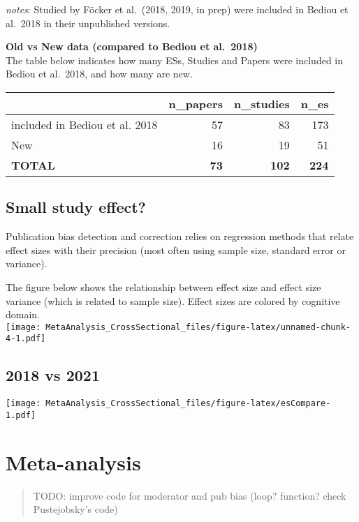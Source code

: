 \documentclass[
]{book}
\begin{document}
\emph{notes}: Studied by Föcker et al.~(2018, 2019, in prep) were included in Bediou et al.~2018
in their unpublished versions.

\textbf{Old vs New data (compared to Bediou et al.~2018) }\\
The table below indicates how many ESs, Studies and Papers were included in
Bediou et al.~2018, and how many are new.

\begin{table}
\centering
\begin{tabular}{l|r|r|r}
\hline
  & n\_papers & n\_studies & n\_es\\
\hline
included in Bediou et al. 2018 & 57 & 83 & 173\\
\hline
New & 16 & 19 & 51\\
\hline
\textbf{TOTAL} & \textbf{73} & \textbf{102} & \textbf{224}\\
\hline
\end{tabular}
\end{table}

\hypertarget{small-study-effect}{%
\section{Small study effect?}\label{small-study-effect}}

Publication bias detection and correction relies on regression methods that relate
effect sizes with their precision (most often using sample size, standard error or variance).

The figure below shows the relationship between effect size and effect size variance
(which is related to sample size). Effect sizes are colored by cognitive domain.\\
\texttt{[image: MetaAnalysis\_CrossSectional\_files/figure-latex/unnamed-chunk-4-1.pdf]}

\hypertarget{vs-2021}{%
\section{2018 vs 2021}\label{vs-2021}}

\texttt{[image: MetaAnalysis\_CrossSectional\_files/figure-latex/esCompare-1.pdf]}

\hypertarget{metaana}{%
\chapter{Meta-analysis}\label{metaana}}

\begin{quote}
TODO: improve code for moderator and pub bias (loop? function? check Pustejobsky's code)
\end{quote}
\end{document}
